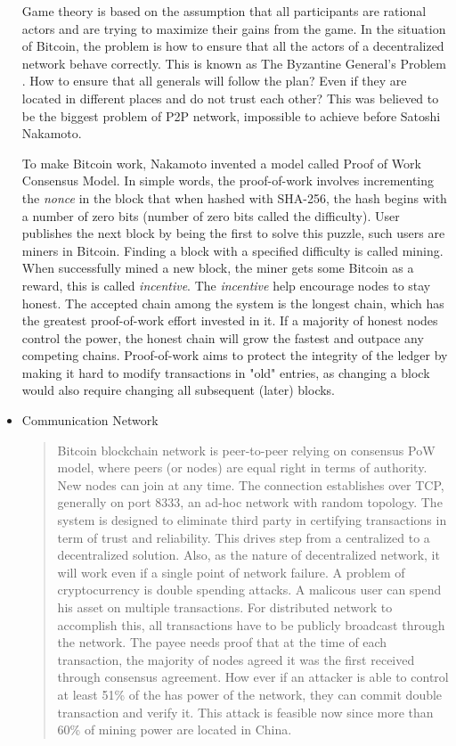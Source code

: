 \begin{itemize}
        Game theory is based on the assumption that all participants are rational actors and are trying to maximize their gains from the game.
        In the situation of Bitcoin, the problem is how to ensure that all the actors of a decentralized network behave correctly.
        This is known as The Byzantine General’s Problem \cite{DBLP:journals/toplas/LamportSP82}.
        How to ensure that all generals will follow the plan? Even if they are located in different places and do not trust each other?
        This was believed to be the biggest problem of P2P network, impossible to achieve before Satoshi Nakamoto.

        To make Bitcoin work, Nakamoto invented a model called Proof of Work Consensus Model.
        In simple words, the proof-of-work involves incrementing the \emph{nonce} in the block that when hashed with SHA-256, the hash begins with a number of zero bits (number of zero bits called the difficulty).
        User publishes the next block by being the first to solve this puzzle, such users are miners in Bitcoin.
        Finding a block with a specified difficulty is called mining. When successfully mined a new block, the miner gets some Bitcoin as a reward, this is called \emph{incentive}.
        The \emph{incentive} help encourage nodes to stay honest.
        The accepted chain among the system is the longest chain, which has the greatest proof-of-work effort invested in it.
        If a majority of honest nodes control the power, the honest chain will grow the fastest and outpace any competing chains.
        Proof-of-work aims to protect the integrity of the ledger by making it hard to modify transactions in "old" entries, as changing a block would also require changing all subsequent (later) blocks.

  \item Communication Network
        \begin{quote}
          Bitcoin blockchain network is peer-to-peer relying on consensus PoW model, where peers (or nodes) are equal right in terms of authority.
          New nodes can join at any time. The connection establishes over TCP, generally on port 8333, an ad-hoc network with random topology.
          The system is designed to eliminate third party in certifying transactions in term of trust and reliability.
          This drives step from a centralized to a decentralized solution.
          Also, as the nature of decentralized network, it will work even if a single point of network failure.
          A problem of cryptocurrency is double spending attacks. A malicous user can spend his asset on multiple transactions.
          For distributed network to accomplish this, all transactions have to be publicly broadcast through the network.
          The payee needs proof that at the time of each transaction, the majority of nodes agreed it was the first received through consensus agreement.
          How ever if an attacker is able to control at least 51\% of the has power of the network, they can commit double transaction and verify it.
          This attack is feasible now since more than 60\% of mining power are located in China.


\end{quote}
\end{itemize}
